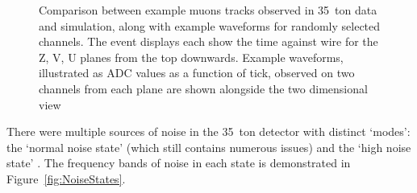 \begin{figure}
  \caption[Comparison between example muons tracks observed in 35~ton data and simulation, along with example waveforms for randomly selected channels.]{Comparison between example muons tracks observed in 35~ton data and simulation, along with example waveforms for randomly selected channels.  The event displays each show the time against wire for the Z, V, U planes from the top downwards.  Example waveforms, illustrated as ADC values as a function of tick, observed on two channels from each plane are shown alongside the two dimensional view}
  \label{fig:DataSimulationNoiseComparison}

\end{figure}

There were multiple sources of noise in the 35~ton detector with distinct `modes': the `normal noise state' (which still contains numerous issues) and the `high noise state' \cite{35tonNoise2016}.  The frequency bands of noise in each state is demonstrated in Figure~\ref{fig:NoiseStates}.

